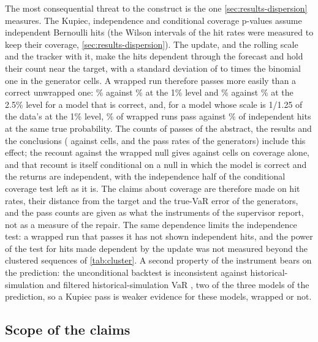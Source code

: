 The most consequential threat to the construct is the one \cref{sec:results-dispersion} measures. The Kupiec, independence and conditional coverage p-values assume independent Bernoulli hits (the Wilson intervals of the hit rates were measured to keep their coverage, \cref{sec:results-dispersion}). The update, and the rolling scale and the tracker with it, make the hits dependent through the forecast and hold their count near the target, with a standard deviation of \dispRatioAciMin{} to \dispRatioAciMax{} times the binomial one in the generator cells. A wrapped run therefore passes more easily than a correct unwrapped one: \dispBOneOneAciPass\% against \dispBOneOneUnwPass\% at the 1\% level and \dispBTwoHalfOneAciPass\% against \dispBTwoHalfOneUnwPass\% at the 2.5\% level for a model that is correct, and, for a model whose scale is 1/1.25 of the data's at the 1\% level, \dispBOneOneTwoFiveAciPass\% of wrapped runs pass against \dispBOneOneTwoFiveAciRefPass\% of independent hits at the same true probability. The counts of passes of the abstract, the results and the conclusions (\tenPassAci{} against \tenPassUnw{} cells, and the pass rates of the generators) include this effect; the recount against the wrapped null gives \dispCWrapCal{} against \dispCUnwExact{} cells on coverage alone, and that recount is itself conditional on a null in which the model is correct and the returns are independent, with the independence half of the conditional coverage test left as it is. The claims about coverage are therefore made on hit rates, their distance from the target and the true-VaR error of the generators, and the pass counts are given as what the instruments of the supervisor report, not as a measure of the repair. The same dependence limits the independence test: a wrapped run that passes it has not shown independent hits, and the power of the test for hits made dependent by the update was not measured beyond the clustered sequences of \cref{tab:cluster}. A second property of the instrument bears on the prediction: the unconditional backtest is inconsistent against historical-simulation and filtered historical-simulation VaR \citep{escanciano2012}, two of the three models of the prediction, so a Kupiec pass is weaker evidence for these models, wrapped or not.

\subsection{Scope of the claims}
\label{sec:limits-scope}

